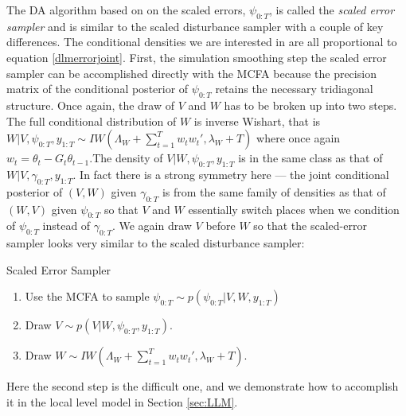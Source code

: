 \documentclass{article}
\begin{document}
The DA algorithm based on on the scaled errors, $\psi_{0:T}$, is called the {\it scaled error sampler} and is similar to the scaled disturbance sampler with a couple of key differences. The conditional densities we are interested in are all proportional to equation \eqref{dlmerrorjoint}. First, the simulation smoothing step the scaled error sampler can be accomplished directly with the MCFA because the precision matrix of the conditional posterior of $\psi_{0:T}$ retains the necessary tridiagonal structure. Once again, the draw of $V$ and $W$ has to be broken up into two steps. The full conditional distribution of $W$ is inverse Wishart, that is $W|V,\psi_{0:T},y_{1:T} \sim IW\left(\Lambda_W + \sum_{t=1}^Tw_tw_t',\lambda_{W} + T\right)$ where once again $w_t = \theta_t - G_t\theta_{t-1}$.The density of $V|W,\psi_{0:T},y_{1:T}$ is in the same class as that of $W|V,\gamma_{0:T},y_{1:T}$. In fact there is a strong symmetry here --- the joint conditional posterior of $(V,W)$ given $\gamma_{0:T}$ is from the same family of densities as that of $(W,V)$ given $\psi_{0:T}$ so that $V$ and $W$ essentially switch places when we condition of $\psi_{0:T}$ instead of $\gamma_{0:T}$. We again draw $V$ before $W$ so that the scaled-error sampler looks very similar to the scaled disturbance sampler: 
\begin{alg*}[Error]Scaled Error Sampler\label{alg:DLMerror}
\begin{enumerate}
\item Use the MCFA to sample $\psi_{0:T} \sim  p(\psi_{0:T}|V,W,y_{1:T})$
\item Draw $V \sim p(V|W,\psi_{0:T},y_{1:T})$.
\item Draw $W \sim IW\left(\Lambda_W + \sum_{t=1}^Tw_tw_t',\lambda_{W} + T\right)$.
\end{enumerate}
\end{alg*}
Here the second step is the difficult one, and we demonstrate how to accomplish it in the local level model in Section \ref{sec:LLM}.
\end{document}
